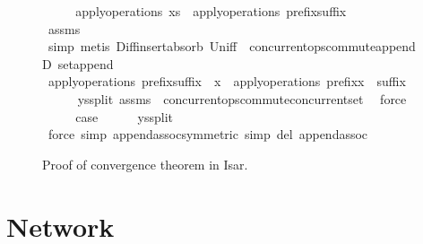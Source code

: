 \documentclass[acmlarge,review,anonymous]{acmart}\settopmatter{printfolios=true}
\begin{document}
\begin{figure}
\begin{isabellebody}
\ \ \isamarkupfalse%
\ \isamarkupfalse%
\ {\isachardoublequoteopen}apply{\isacharunderscore}operations\ xs\ {\isacharequal}\ apply{\isacharunderscore}operations\ {\isacharparenleft}prefix{\isacharat}suffix{\isacharparenright}{\isachardoublequoteclose}\isanewline
\ \ \ \ \isamarkupfalse%
\ assms\ \isamarkupfalse%
\ simp\ {\isacharparenleft}metis\ Diff{\isacharunderscore}insert{\isacharunderscore}absorb\ Un{\isacharunderscore}iff\ {\isacharasterisk}\ concurrent{\isacharunderscore}ops{\isacharunderscore}commute{\isacharunderscore}appendD\ set{\isacharunderscore}append{\isacharparenright}\isanewline
\ \ \isamarkupfalse%
\ \isamarkupfalse%
\ {\isachardoublequoteopen}apply{\isacharunderscore}operations\ {\isacharparenleft}prefix{\isacharat}suffix\ {\isacharat}\ {\isacharbrackleft}x{\isacharbrackright}{\isacharparenright}\ {\isacharequal}\ apply{\isacharunderscore}operations\ {\isacharparenleft}prefix{\isacharat}x\ {\isacharhash}\ suffix{\isacharparenright}{\isachardoublequoteclose}\isanewline
\ \ \ \ \isamarkupfalse%
\ ys{\isacharunderscore}split\ assms\ {\isacharasterisk}{\isacharasterisk}\ concurrent{\isacharunderscore}ops{\isacharunderscore}commute{\isacharunderscore}concurrent{\isacharunderscore}set\ \isamarkupfalse%
\ force\isanewline
\ \ \isamarkupfalse%
\ \isamarkupfalse%
\ {\isacharquery}case\isanewline
\ \ \ \ \isamarkupfalse%
\ ys{\isacharunderscore}split\ \isamarkupfalse%
\ {\isacharparenleft}force\ simp{\isacharcolon}\ append{\isacharunderscore}assoc{\isacharbrackleft}symmetric{\isacharbrackright}\ simp\ del{\isacharcolon}\ append{\isacharunderscore}assoc{\isacharparenright}\isanewline
{}\isamarkupfalse%
  \end{isabellebody}
  \caption{Proof of convergence theorem in Isar.}
  \label{fig.convergence}
\end{figure}



\section{Network}
\label{sect.network}
\end{document}
